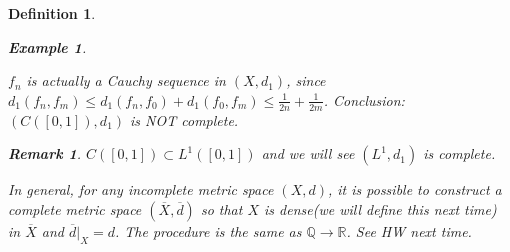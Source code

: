 \documentclass{article}
\newtheorem*{definition}{Definition}
\newtheorem*{remark}{Remark}
\newtheorem*{example}{Example}
\begin{document}
\begin{definition}
\begin{example}
\begin{enumerate}
\[            \] 
            $f_n$ is actually a Cauchy sequence in $(X, d_1)$, since \\
            $d_1(f_n, f_m) \le d_1(f_n, f_0) + d_1(f_0, f_m) \le \frac{1}{2n} + \frac{1}{2m}$.
            Conclusion: $(C([0, 1]), d_1)$ is NOT complete.
            \begin{remark}
                $C([0, 1]) \subset L^1([0, 1])$ and we will see $(L^1, d_1)$ is complete.
            \end{remark}
        \end{enumerate}
    \end{example}
    In general, for any incomplete metric space $(X, d)$, it is possible to construct a complete metric space
    $(\overline{X}, \overline{d})$ so that $X$ is dense(we will define this next time) in $\overline{X}$ and
    $\overline{d}|_X = d$.
    The procedure is the same as $\mathbb{Q} \rightarrow \mathbb{R}$.
    See HW next time.
\end{definition}
\end{document}
